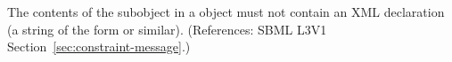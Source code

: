 The contents of the \Message subobject in a \Constraint object must not
contain an XML declaration (\ie a string of the form  or similar).  (References: SBML L3V1
Section~\ref{sec:constraint-message}.)
